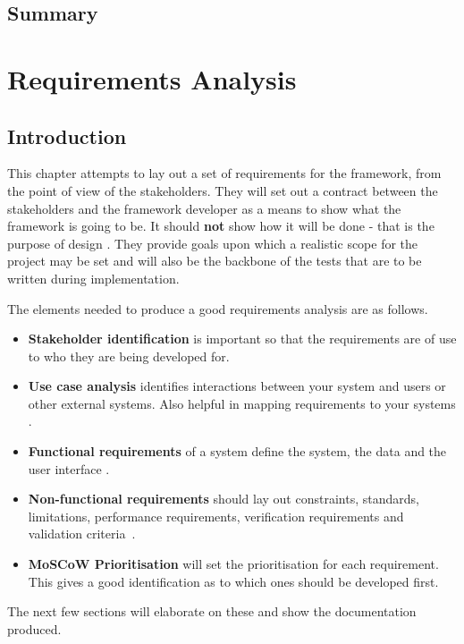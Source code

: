 \documentclass[11pt,oneside]{report}
\begin{document}
				\section{Summary}
	\chapter{Requirements Analysis}\label{chap:req}
	\section{Introduction}
	This chapter attempts to lay out a set of requirements for the framework, from the point of view of the stakeholders.
	They will set out a contract between the stakeholders and the framework developer as a means to show what the framework is going to be. It should \textbf{not} show how it will be done - that is the purpose of design \cite{book:dawson}.
	They provide goals upon which a realistic scope for the project may be set and will also be the backbone of the tests that are to be written during implementation.
	
	The elements needed to produce a good requirements analysis are as follows.
	\begin{itemize}
		\item \textbf{Stakeholder identification} is important so that the requirements are of use to who they are being developed for.
		\item \textbf{Use case analysis} identifies interactions between your system and users or other external systems. Also helpful in mapping requirements to your systems \cite{book:uml}.
		\item \textbf{Functional requirements} of a system define the system, the data and the user interface \cite{book:dawson}.
		\item \textbf{Non-functional requirements} should lay out constraints, standards, limitations, performance requirements, verification requirements and validation criteria~\cite{book:dawson}.
		\item \textbf{MoSCoW Prioritisation} will set the prioritisation for each requirement. This gives a good identification as to which ones should be developed first.
	\end{itemize}
	The next few sections will elaborate on these and show the documentation produced. 
		
\end{document}
